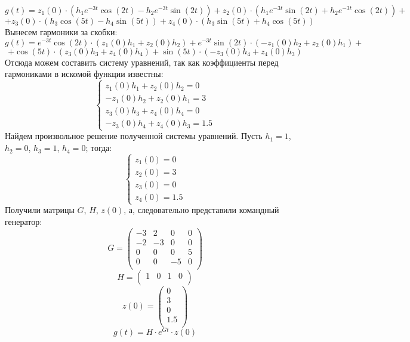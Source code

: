 \documentclass[a4paper, 12pt]{article}
\begin{document}
\[
    g(t) = z_1(0) \cdot (h_1e^{-3t}\cos{(2t)} - h_2e^{-3t}\sin{(2t)}) + z_2(0) \cdot (h_1e^{-3t}\sin{(2t)} + h_2e^{-3t}\cos{(2t)}) + 
\]
\[
    + z_3(0) \cdot (h_3\cos{(5t)} - h_4\sin{(5t)}) + z_4(0) \cdot (h_3\sin{(5t)} + h_4\cos{(5t)})
\]
Вынесем гармоники за скобки:
\[
    g(t) = e^{-3t}\cos{(2t)} \cdot (z_1(0)h_1 + z_2(0)h_2) + e^{-3t}\sin{(2t)} \cdot (-z_1(0)h_2 + z_2(0)h_1) +
\]
\[
    + \cos(5t) \cdot (z_3(0)h_3 + z_4(0)h_4) + \sin{(5t)} \cdot (-z_3(0)h_4 + z_4(0)h_3)
\]
\newpage
Отсюда можем составить систему уравнений, так как коэффициенты перед гармониками в искомой функции известны:
\[
    \left\{
        \begin{aligned}
            z_1(0)h_1 + z_2(0)h_2 = 0 \\
            -z_1(0)h_2 + z_2(0)h_1 = 3 \\
            z_3(0)h_3 + z_4(0)h_4 = 0 \\
            -z_3(0)h_4 + z_4(0)h_3 = 1.5
        \end{aligned}
    \right.
\]
Найдем произвольное решение полученной системы уравнений. Пусть $h_1 = 1$, $h_2 = 0$, $h_3 = 1$, $h_4 = 0$; тогда:
\[
    \left\{
        \begin{aligned}
            z_1(0) = 0 \\
            z_2(0) = 3 \\
            z_3(0) = 0 \\
            z_4(0) = 1.5
        \end{aligned}
    \right.
\]
Получили матрицы $G$, $H$, $z(0)$, а, следовательно представили командный генератор:
\[
    G = \begin{pmatrix}
        -3 & 2 & 0 & 0 \\
        -2 & -3 & 0 & 0 \\
        0 & 0 & 0 & 5 \\
        0 & 0 & -5 & 0 \\
    \end{pmatrix}
\]
\[
    H = \begin{pmatrix}
        1 & 0 & 1 & 0 \\
    \end{pmatrix}
\]
\[
    z(0) = \begin{pmatrix}
        0 \\
        3 \\
        0 \\
        1.5 \\
    \end{pmatrix}
\]
\[
    g(t) = H \cdot e^{Gt} \cdot z(0)
\]
\end{document}
